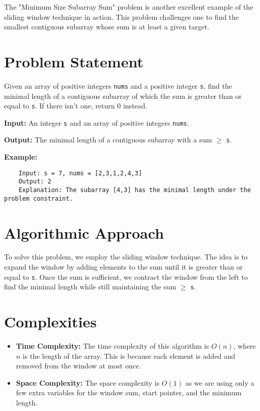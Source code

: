 \label{sec:Minimum_Size_Subarray_Sum}

The "Minimum Size Subarray Sum" problem is another excellent example of the sliding window technique in action. This problem challenges one to find the smallest contiguous subarray whose sum is at least a given target.

\section*{Problem Statement}

Given an array of positive integers \texttt{nums} and a positive integer \texttt{s}, find the minimal length of a contiguous subarray of which the sum is greater than or equal to \texttt{s}. If there isn't one, return 0 instead.

\textbf{Input:} An integer \texttt{s} and an array of positive integers \texttt{nums}.

\textbf{Output:} The minimal length of a contiguous subarray with a sum $\geq$ \texttt{s}.

\textbf{Example:}
\begin{verbatim}
    Input: s = 7, nums = [2,3,1,2,4,3]
    Output: 2
    Explanation: The subarray [4,3] has the minimal length under the problem constraint.
\end{verbatim}


\section*{Algorithmic Approach}

To solve this problem, we employ the sliding window technique. The idea is to expand the window by adding elements to the sum until it is greater than or equal to \texttt{s}. Once the sum is sufficient, we contract the window from the left to find the minimal length while still maintaining the sum $\geq$ \texttt{s}.

\section*{Complexities}

\begin{itemize}
    \item \textbf{Time Complexity:} The time complexity of this algorithm is \(O(n)\), where \(n\) is the length of the array. This is because each element is added and removed from the window at most once.
    \item \textbf{Space Complexity:} The space complexity is \(O(1)\) as we are using only a few extra variables for the window sum, start pointer, and the minimum length.
\end{itemize}

